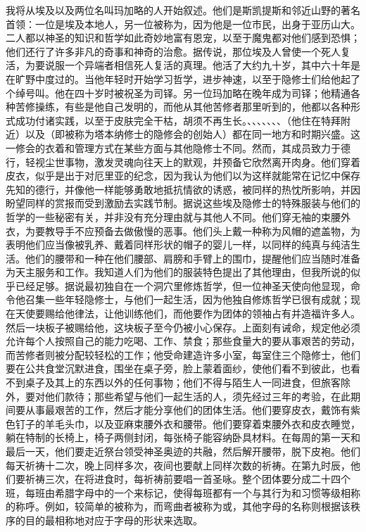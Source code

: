我将从埃及以及两位名叫玛加略的人开始叙述。他们是斯凯提斯和邻近山野的著名首领：一位是埃及本地人，另一位被称为，因为他是一位市民，出身于亚历山大。二人都以神圣的知识和哲学如此奇妙地富有恩宠，以至于魔鬼都对他们感到恐惧；他们还行了许多非凡的奇事和神奇的治愈。据传说，那位埃及人曾使一个死人复活，为要说服一个异端者相信死人复活的真理。他活了大约九十岁，其中六十年是在旷野中度过的。当他年轻时开始学习哲学，进步神速，以至于隐修士们给他起了个绰号叫。他在四十岁时被祝圣为司铎。另一位玛加略在晚年成为司铎；他精通各种苦修操练，有些是他自己发明的，而他从其他苦修者那里听到的，他都以各种形式成功付诸实践，以至于皮肤完全干枯，胡须不再生长。、、、、、、、（他住在特拜附近）以及（即被称为塔本纳修士的隐修会的创始人）都在同一地方和时期兴盛。这一修会的衣着和管理方式在某些方面与其他隐修士不同。然而，其成员致力于德行，轻视尘世事物，激发灵魂向往天上的默观，并预备它欣然离开肉身。他们穿着皮衣，似乎是出于对厄里亚的纪念，因为我认为他们以为这样就能常在记忆中保存先知的德行，并像他一样能够勇敢地抵抗情欲的诱惑，被同样的热忱所影响，并因盼望同样的赏报而受到激励去实践节制。据说这些埃及隐修士的特殊服装与他们的哲学的一些秘密有关，并非没有充分理由就与其他人不同。他们穿无袖的束腰外衣，为要教导手不应预备去做傲慢的恶事。他们头上戴一种称为风帽的遮盖物，为表明他们应当像被乳养、戴着同样形状的帽子的婴儿一样，以同样的纯真与纯洁生活。他们的腰带和一种在他们腰部、肩膀和手臂上的围巾，提醒他们应当随时准备为天主服务和工作。我知道人们为他们的服装特色提出了其他理由，但我所说的似乎已经足够。据说最初独自在一个洞穴里修炼哲学，但一位神圣天使向他显现，命令他召集一些年轻隐修士，与他们一起生活，因为他独自修炼哲学已很有成就；现在天使要赐给他律法，让他训练他们，而他要作为团体的领袖占有并造福许多人。然后一块板子被赐给他，这块板子至今仍被小心保存。上面刻有诫命，规定他必须允许每个人按照自己的能力吃喝、工作、禁食；那些食量大的要从事艰苦的劳动，而苦修者则被分配较轻松的工作；他受命建造许多小室，每室住三个隐修士，他们要在公共食堂沉默进食，围坐在桌子旁，脸上蒙着面纱，使他们看不到彼此，也看不到桌子及其上的东西以外的任何事物；他们不得与陌生人一同进食，但旅客除外，要对他们款待；那些希望与他们一起生活的人，须先经过三年的考验，在此期间要从事最艰苦的工作，然后才能分享他们的团体生活。他们要穿皮衣，戴饰有紫色钉子的羊毛头巾，以及亚麻束腰外衣和腰带。他们要穿着束腰外衣和皮衣睡觉，躺在特制的长椅上，椅子两侧封闭，每张椅子能容纳卧具材料。在每周的第一天和最后一天，他们要走近祭台领受神圣奥迹的共融，然后解开腰带，脱下皮袍。他们每天祈祷十二次，晚上同样多次，夜间也要献上同样次数的祈祷。在第九时辰，他们要祈祷三次，在将进食时，每祈祷前要唱一首圣咏。整个团体要分成二十四个班，每班由希腊字母中的一个来标记，使得每班都有一个与其行为和习惯等级相称的称呼。例如，较简单的被称为，而弯曲者被称为或，其他字母的名称则根据该秩序的目的最相称地对应于字母的形状来选取。\par

